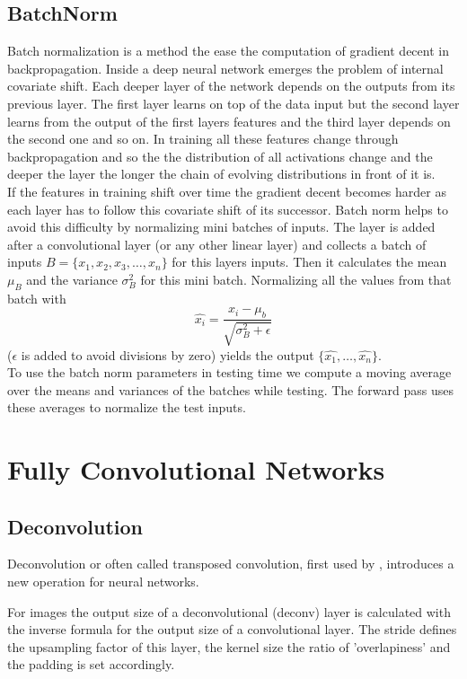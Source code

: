 \subsection{BatchNorm} %
\label{sub:conepts:nn:batchnorm}
Batch normalization \citep{ioffe_batch_2015} is a method the ease the computation of gradient decent in backpropagation. Inside a deep neural network emerges the problem of internal covariate shift. Each deeper layer of the network depends on the outputs from its previous layer. The first layer learns on top of the data input but the second layer learns from the output of the first layers features and the third layer depends on the second one and so on. In training all these features change through backpropagation and so the the distribution of all activations change and the deeper the layer the longer the chain of evolving distributions in front of it is.\\
If the features in training shift over time the gradient decent becomes harder as each layer has to follow this covariate shift of its successor. Batch norm helps to avoid this difficulty by normalizing mini batches of inputs. The layer is added after a convolutional layer (or any other linear layer) and collects a batch of inputs $B = \{x_1, x_2, x_3, \dots, x_n\}$ for this layers inputs. Then it calculates the mean $\mu_B$ and the variance $\sigma_B^2$ for this mini batch. Normalizing all the values from that batch  with
\begin{equation}
    \hat{x_i} = \frac{x_i - \mu_b}{\sqrt{\sigma_B^2 + \epsilon}}
\end{equation}
($\epsilon$ is added to avoid divisions by zero) yields the output $\{\hat{x_1},\dots,\hat{x_n}\}$.\\
To use the batch norm parameters in testing time we compute a moving average over the means and variances of the batches while testing. The forward pass uses these averages to normalize the test inputs.

\section{Fully Convolutional Networks}
\label{sec:concepts:fcn}

\subsection{Deconvolution} %
\label{sub:conepts:fcn:deconv}
Deconvolution or often called transposed convolution, first used by \citet{zeiler_deconvolutional_2010}, introduces a new operation for neural networks.

For images the output size of a deconvolutional (deconv) layer is calculated with the inverse formula for the output size of a convolutional layer. The stride defines the upsampling factor of this layer, the kernel size the ratio of 'overlapiness' and the padding is set accordingly.

